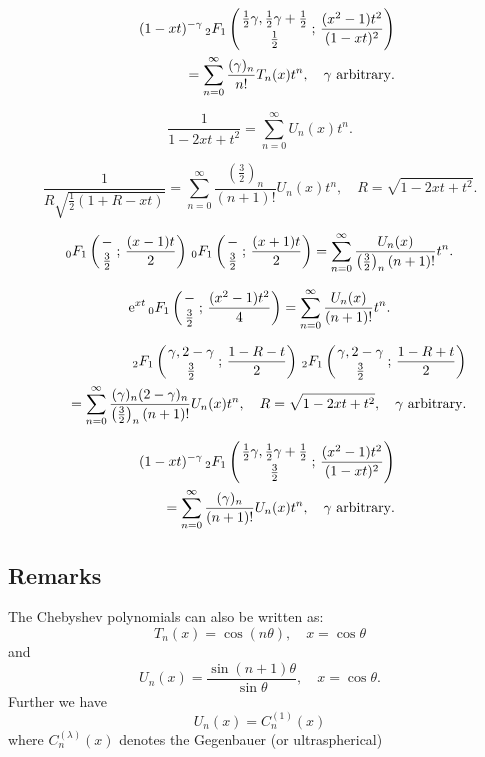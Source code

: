 \documentclass[envcountchap,graybox]{svmono}
\newcommand{\hyp}[5]{\mbox{}_{#1}{F}_{#2}
\left(\genfrac{}{}{0pt}{}{#3}{#4}\,;\,#5\right)}
\newcommand{\e}{\textrm{e}}
\begin{document}
\begin{eqnarray}
\label{GenChebyshevI6}
& &(1-xt)^{-\gamma}\,\hyp{2}{1}{\frac{1}{2}\gamma,\frac{1}{2}\gamma+\frac{1}{2}}{\frac{1}{2}}
{\frac{(x^2-1)t^2}{(1-xt)^2}}\nonumber\\
& &=\sum_{n=0}^{\infty}\frac{(\gamma)_n}{n!}T_n(x)t^n,\quad\textrm{$\gamma$ arbitrary}.
\end{eqnarray}

\begin{equation}
\label{GenChebyshevII1}
\frac{1}{1-2xt+t^2}=\sum_{n=0}^{\infty}U_n(x)t^n.
\end{equation}

\begin{equation}
\label{GenChebyshevII2}
\frac{1}{R\sqrt{\frac{1}{2}(1+R-xt)}}=\sum_{n=0}^{\infty}
\frac{\left(\frac{3}{2}\right)_n}{(n+1)!}U_n(x)t^n,\quad R=\sqrt{1-2xt+t^2}.
\end{equation}

\begin{equation}
\label{GenChebyshevII3}
\hyp{0}{1}{-}{\frac{3}{2}}{\frac{(x-1)t}{2}}\,
\hyp{0}{1}{-}{\frac{3}{2}}{\frac{(x+1)t}{2}}=
\sum_{n=0}^{\infty}\frac{U_n(x)}{\left(\frac{3}{2}\right)_n(n+1)!}t^n.
\end{equation}

\begin{equation}
\label{GenChebyshevII4}
\e^{xt}\,\hyp{0}{1}{-}{\frac{3}{2}}{\frac{(x^2-1)t^2}{4}}=
\sum_{n=0}^{\infty}\frac{U_n(x)}{(n+1)!}t^n.
\end{equation}

\begin{eqnarray}
\label{GenChebyshevII5}
& &\hyp{2}{1}{\gamma,2-\gamma}{\frac{3}{2}}{\frac{1-R-t}{2}}\,
\hyp{2}{1}{\gamma,2-\gamma}{\frac{3}{2}}{\frac{1-R+t}{2}}\nonumber\\
& &{}=\sum_{n=0}^{\infty}\frac{(\gamma)_n(2-\gamma)_n}{\left(\frac{3}{2}\right)_n(n+1)!}U_n(x)t^n,
\quad R=\sqrt{1-2xt+t^2},\quad\textrm{$\gamma$ arbitrary}.
\end{eqnarray}

\begin{eqnarray}
\label{GenChebyshevII6}
& &(1-xt)^{-\gamma}\,\hyp{2}{1}{\frac{1}{2}\gamma,\frac{1}{2}\gamma+\frac{1}{2}}{\frac{3}{2}}
{\frac{(x^2-1)t^2}{(1-xt)^2}}\nonumber\\
& &{}=\sum_{n=0}^{\infty}\frac{(\gamma)_n}{(n+1)!}U_n(x)t^n,\quad\textrm{$\gamma$ arbitrary}.
\end{eqnarray}

\subsection*{Remarks}
The Chebyshev polynomials can also be written as:
$$T_n(x)=\cos(n\theta),\quad x=\cos\theta$$
and
$$U_n(x)=\frac{\sin (n+1)\theta}{\sin\theta},\quad x=\cos\theta.$$
Further we have
$$U_n(x)=C_n^{(1)}(x)$$
where $C_n^{(\lambda)}(x)$ denotes the Gegenbauer (or ultraspherical)
\end{document}
